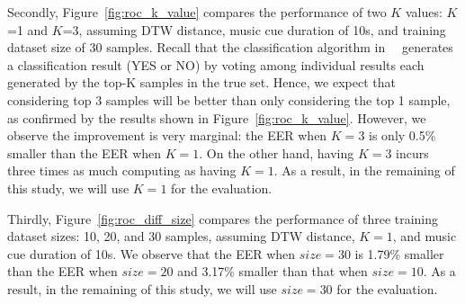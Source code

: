 Secondly, Figure~\ref{fig:roc_k_value} compares the performance of two $K$ values: $K$=1 and $K$=3, assuming DTW distance, music cue duration of 10s, and training dataset size of 30 samples.  Recall that the classification algorithm in ~\systemname~generates a classification result (YES or NO) by voting among individual results each generated by the top-K samples in the true set. Hence, we expect that considering top 3 samples will be better than only considering the top 1 sample, as confirmed by the results shown in Figure~\ref{fig:roc_k_value}. However, we observe the improvement is very marginal: the EER when $K=3$ is only 0.5\% smaller than the EER when $K=1$. On the other hand, having $K=3$ incurs three times as much computing as having $K=1$. As a result, in the remaining of this study, we will use $K=1$ for the evaluation.

Thirdly, Figure~\ref{fig:roc_diff_size} compares the performance of three training dataset sizes: 10, 20, and 30 samples, assuming DTW distance, $K=1$, and music cue duration of 10s. We observe that the EER when $size=30$ is 1.79\% smaller than the EER when $size=20$ and 3.17\% smaller than that when $size=10$. As a result, in the remaining of this study, we will use $size=30$ for the evaluation.



